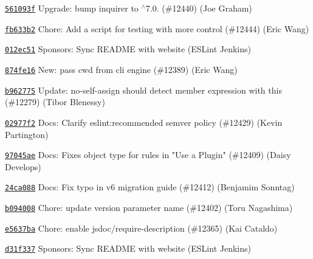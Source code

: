 \begin{DoxyItemize}
\item \href{https://github.com/eslint/eslint/commit/561093fc4267a4ae317d63bc9f103020fad88802}{\texttt{ {\ttfamily 561093f}}} Upgrade\+: bump inquirer to \texorpdfstring{$^\wedge$}{\string^}7.0. (\#12440) (Joe Graham)
\item \href{https://github.com/eslint/eslint/commit/fb633b2bbd0a390b247047524fdd1f612dbab803}{\texttt{ {\ttfamily fb633b2}}} Chore\+: Add a script for testing with more control (\#12444) (Eric Wang)
\item \href{https://github.com/eslint/eslint/commit/012ec5151113a2be06fc0e4cd208d714e52dbc57}{\texttt{ {\ttfamily 012ec51}}} Sponsors\+: Sync README with website (ESLint Jenkins)
\item \href{https://github.com/eslint/eslint/commit/874fe1642a10a0fb937ccccdd4d22343b84f80dc}{\texttt{ {\ttfamily 874fe16}}} New\+: pass cwd from cli engine (\#12389) (Eric Wang)
\item \href{https://github.com/eslint/eslint/commit/b962775b8cb7c90985a5ab63e56744bb2ba79644}{\texttt{ {\ttfamily b962775}}} Update\+: no-\/self-\/assign should detect member expression with this (\#12279) (Tibor Blenessy)
\item \href{https://github.com/eslint/eslint/commit/02977f25a922dd0b8617c16116bb4364d0f30e94}{\texttt{ {\ttfamily 02977f2}}} Docs\+: Clarify {\ttfamily eslint\+:recommended} semver policy (\#12429) (Kevin Partington)
\item \href{https://github.com/eslint/eslint/commit/97045ae0805e6503887eef0b131dcb9e70b6d185}{\texttt{ {\ttfamily 97045ae}}} Docs\+: Fixes object type for {\ttfamily rules} in "{}\+Use a Plugin"{} (\#12409) (Daisy Develops)
\item \href{https://github.com/eslint/eslint/commit/24ca088fdc901feef8f10b050414fbde64b55c7d}{\texttt{ {\ttfamily 24ca088}}} Docs\+: Fix typo in v6 migration guide (\#12412) (Benjamim Sonntag)
\item \href{https://github.com/eslint/eslint/commit/b094008fb196dc1de5b4c27b7dbf0bcbb4b7b352}{\texttt{ {\ttfamily b094008}}} Chore\+: update version parameter name (\#12402) (Toru Nagashima)
\item \href{https://github.com/eslint/eslint/commit/e5637badd42f087d115f81575b832097fe6fe554}{\texttt{ {\ttfamily e5637ba}}} Chore\+: enable jsdoc/require-\/description (\#12365) (Kai Cataldo)
\item \href{https://github.com/eslint/eslint/commit/d31f3370396ec4868722bdc044aa697b135ac183}{\texttt{ {\ttfamily d31f337}}} Sponsors\+: Sync README with website (ESLint Jenkins)

\end{DoxyItemize}
